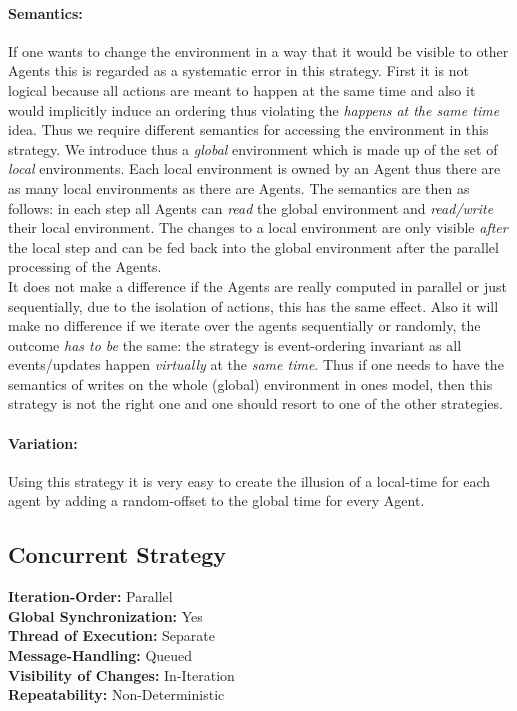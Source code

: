 \paragraph{Semantics:} If one wants to change the environment in a way that it would be visible to other Agents this is regarded as a systematic error in this strategy. First it is not logical because all actions are meant to happen at the same time and also it would implicitly induce an ordering thus violating the \textit{happens at the same time} idea. Thus we require different semantics for accessing the environment in this strategy. We introduce thus a \textit{global} environment which is made up of the set of \textit{local} environments. Each local environment is owned by an Agent thus there are as many local environments as there are Agents. The semantics are then as follows: in each step all Agents can \textit{read} the global environment and \textit{read/write} their local environment. The changes to a local environment are only visible \textit{after} the local step and can be fed back into the global environment after the parallel processing of the Agents. \\
It does not make a difference if the Agents are really computed in parallel or just sequentially, due to the isolation of actions, this has the same effect. Also it will make no difference if we iterate over the agents sequentially or randomly, the outcome \textit{has to be} the same: the strategy is event-ordering invariant as all events/updates happen \textit{virtually} at the \textit{same time}. Thus if one needs to have the semantics of writes on the whole (global) environment in ones model, then this strategy is not the right one and one should resort to one of the other strategies.

\paragraph{Variation:} Using this strategy it is very easy to create the illusion of a local-time for each agent by adding a random-offset to the global time for every Agent.


\subsection{Concurrent Strategy}
\textbf{Iteration-Order:} Parallel \\
\textbf{Global Synchronization:} Yes \\
\textbf{Thread of Execution:} Separate \\
\textbf{Message-Handling:} Queued \\
\textbf{Visibility of Changes:}	In-Iteration \\
\textbf{Repeatability:}	Non-Deterministic 


